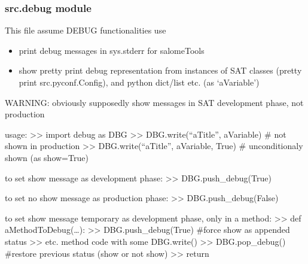 \documentclass[a4paper,10pt,english]{sphinxmanual}
\begin{document}
\begin{fulllineitems}
\begin{fulllineitems}
\begin{quote}
\begin{description}
\end{description}\end{quote}

\end{fulllineitems}


\begin{fulllineitems}
\label{\detokenize{commands/apidoc/src:src.compilation.Builder.wmake}}
\end{fulllineitems}


\end{fulllineitems}



\subsubsection{src.debug module}
\label{\detokenize{commands/apidoc/src:module-src.debug}}\label{\detokenize{commands/apidoc/src:src-debug-module}}
This file assume DEBUG functionalities use
\begin{itemize}
\item {} 
print debug messages in sys.stderr for salomeTools

\item {} 
show pretty print debug representation from instances of SAT classes
(pretty print src.pyconf.Config), and python dict/list etc. (as ‘aVariable’)

\end{itemize}

WARNING: obviously supposedly show messages in SAT development phase, not production

usage:
\textgreater{}\textgreater{} import debug as DBG
\textgreater{}\textgreater{} DBG.write(“aTitle”, aVariable)        \# not shown in production 
\textgreater{}\textgreater{} DBG.write(“aTitle”, aVariable, True)  \# unconditionaly shown (as show=True)

to set show message as development phase:
\textgreater{}\textgreater{} DBG.push\_debug(True)

to set no show message as production phase:
\textgreater{}\textgreater{} DBG.push\_debug(False)

to set show message temporary as development phase, only in a method:
\textgreater{}\textgreater{} def aMethodToDebug(…):
\textgreater{}\textgreater{}   DBG.push\_debug(True)              \#force show as appended status
\textgreater{}\textgreater{}   etc. method code with some DBG.write()
\textgreater{}\textgreater{}   DBG.pop\_debug()                   \#restore previous status (show or not show)
\textgreater{}\textgreater{}   return
\end{document}
